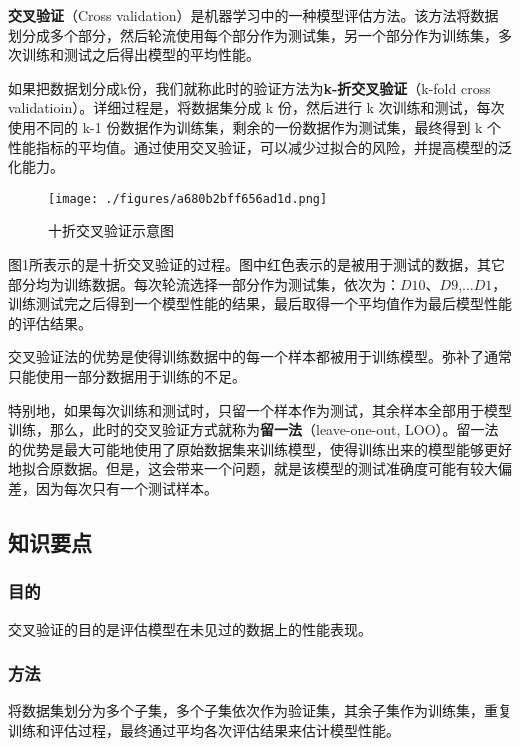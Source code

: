 


\textbf{交叉验证}（Cross validation）是机器学习中的一种模型评估方法。该方法将数据划分成多个部分，然后轮流使用每个部分作为测试集，另一个部分作为训练集，多次训练和测试之后得出模型的平均性能。

如果把数据划分成k份，我们就称此时的验证方法为\textbf{k-折交叉验证}（k-fold cross validatioin）。详细过程是，将数据集分成 k 份，然后进行 k 次训练和测试，每次使用不同的 k-1 份数据作为训练集，剩余的一份数据作为测试集，最终得到 k 个性能指标的平均值。通过使用交叉验证，可以减少过拟合的风险，并提高模型的泛化能力。

\begin{figure}[ht]
\centering
\texttt{[image: ./figures/a680b2bff656ad1d.png]}
\caption{十折交叉验证示意图} \label{fig_CroVal_1}
\end{figure}
图1所表示的是十折交叉验证的过程。图中红色表示的是被用于测试的数据，其它部分均为训练数据。每次轮流选择一部分作为测试集，依次为：$D10$、$D9$,...$D1$，训练测试完之后得到一个模型性能的结果，最后取得一个平均值作为最后模型性能的评估结果。

交叉验证法的优势是使得训练数据中的每一个样本都被用于训练模型。弥补了通常只能使用一部分数据用于训练的不足。

特别地，如果每次训练和测试时，只留一个样本作为测试，其余样本全部用于模型训练，那么，此时的交叉验证方式就称为\textbf{留一法}（leave-one-out, LOO）。留一法的优势是最大可能地使用了原始数据集来训练模型，使得训练出来的模型能够更好地拟合原数据。但是，这会带来一个问题，就是该模型的测试准确度可能有较大偏差，因为每次只有一个测试样本。


\subsection{知识要点}
\subsubsection{目的}
交叉验证的目的是评估模型在未见过的数据上的性能表现。

\subsubsection{方法}
将数据集划分为多个子集，多个子集依次作为验证集，其余子集作为训练集，重复训练和评估过程，最终通过平均各次评估结果来估计模型性能。

